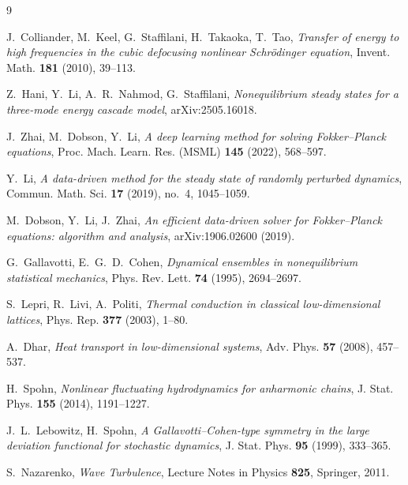 \documentclass[11pt,a4paper]{article}
\theoremstyle{definition}
\numberwithin{equation}{section}   %
\begin{document}
\begin{thebibliography}{9}

J.~Colliander, M.~Keel, G.~Staffilani, H.~Takaoka, T.~Tao,
\emph{Transfer of energy to high frequencies in the cubic defocusing nonlinear
Schr\"odinger equation}, Invent. Math. \textbf{181} (2010), 39--113.

Z.~Hani, Y.~Li, A.~R.~Nahmod, G.~Staffilani,
\emph{Nonequilibrium steady states for a three-mode energy cascade model},
arXiv:2505.16018.

J.~Zhai, M.~Dobson, Y.~Li,
\emph{A deep learning method for solving Fokker--Planck equations},
Proc. Mach. Learn. Res. (MSML) \textbf{145} (2022), 568--597.

Y.~Li,
\emph{A data-driven method for the steady state of randomly perturbed dynamics},
Commun. Math. Sci. \textbf{17} (2019), no.~4, 1045--1059.

M.~Dobson, Y.~Li, J.~Zhai,
\emph{An efficient data-driven solver for Fokker--Planck equations: algorithm
and analysis}, arXiv:1906.02600 (2019).

G.~Gallavotti, E.~G.~D.~Cohen,
\emph{Dynamical ensembles in nonequilibrium statistical mechanics},
Phys. Rev. Lett. \textbf{74} (1995), 2694--2697.

S.~Lepri, R.~Livi, A.~Politi,
\emph{Thermal conduction in classical low-dimensional lattices},
Phys. Rep. \textbf{377} (2003), 1--80.

A.~Dhar,
\emph{Heat transport in low-dimensional systems},
Adv. Phys. \textbf{57} (2008), 457--537.

H.~Spohn,
\emph{Nonlinear fluctuating hydrodynamics for anharmonic chains},
J. Stat. Phys. \textbf{155} (2014), 1191--1227.

J.~L.~Lebowitz, H.~Spohn,
\emph{A Gallavotti--Cohen-type symmetry in the large deviation functional for
stochastic dynamics}, J. Stat. Phys. \textbf{95} (1999), 333--365.

S.~Nazarenko, \emph{Wave Turbulence}, Lecture Notes in Physics \textbf{825}, Springer, 2011.

\end{thebibliography}
\end{document}
